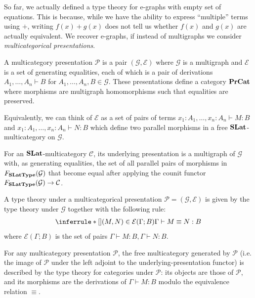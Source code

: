 So far, we actually defined a type theory for e-graphs with empty set of equations.
This is because, while we have the ability to express \enquote{multiple} terms using $+$, writing $f(x) + g(x)$ does not tell us whether $f(x)$ and $g(x)$ are actually equivalent.
We recover e-graphs, if instead of multigraphs we consider \emph{multicategorical presentations}.

\begin{definition}
  A multicategory presentation $\mathcal{P}$ is a pair $(\mathcal{G}, \mathcal{E})$ where $\mathcal{G}$ is a multigraph and $\mathcal{E}$ is a set of generating equalities, each of which is a pair of derivations $A_1, \ldots, A_n \vdash B$ for $A_1, \ldots, A_n,B \in \mathcal{G}$.
  These presentations define a category $\mathbf{PrCat}$ where morphisms are multigraph homomorphisms such that equalities are preserved.
\end{definition}
Equivalently, we can think of $\mathcal{E}$ as a set of pairs of terms $x_1 : A_1, \ldots, x_n : A_n \vdash M : B$ and $x_1 : A_1, \ldots, x_n : A_n \vdash N : B$ which define two parallel morphisms in a free $\mathbf{SLat}$-multicategory on $\mathcal{G}$.

\begin{definition}
For an $\mathbf{SLat}$-multicategory $\mathcal{C}$, its underlying presentation is a multigraph of $\mathcal{G}$ with, as generating equalities, the set of all parallel pairs of morphisms in $F_{\mathbf{SLatType}}(\mathcal{G})$ that become equal after applying the counit functor $F_{\mathbf{SLatType}}(\mathcal{G}) \to \mathcal{C}$.
\end{definition}

\begin{definition}
\label{def:type_theory_under_presentation}
  A type theory under a multicategorical presentation $\mathcal{P} = (\mathcal{G}, \mathcal{E})$ is given by the type theory under $\mathcal{G}$ together with the following rule:
  \begin{align*}
    \inferrule*[]{(M,N) \in \mathcal{E}(\Gamma; B)}{\Gamma \vdash M \equiv N : B}
  \end{align*}
  where $\mathcal{E}(\Gamma; B)$ is the set of pairs $\Gamma \vdash M : B, \Gamma \vdash N : B$.
\end{definition}

\begin{proposition}
  For any multicategory presentation $\mathcal{P}$, the free multicategory generated by $\mathcal{P}$ (i.e. the image of $\mathcal{P}$ under the left adjoint to the underlying-presentation functor) is described by the type theory for categories under $\mathcal{P}$: its objects are those of $\mathcal{P}$, and its morphisms are the derivations of $\Gamma \vdash M : B$ modulo the equivalence relation $\equiv$.
\end{proposition}


